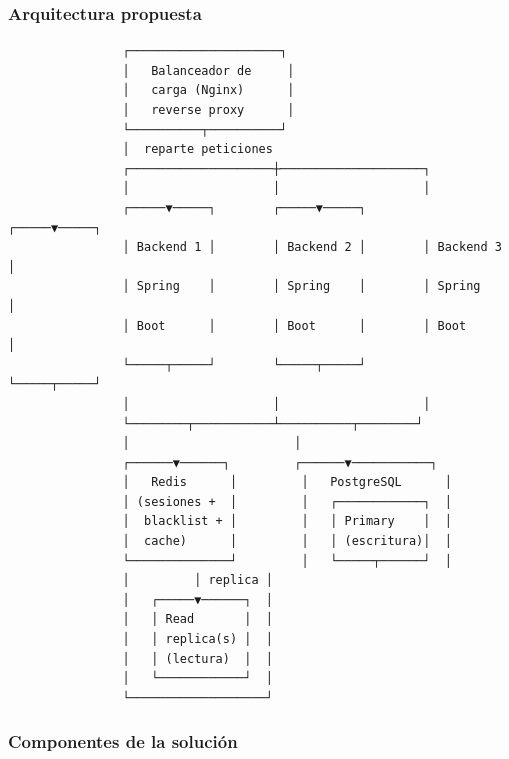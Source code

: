 \documentclass[12pt]{article}
\begin{document}
	\subsubsection*{Arquitectura propuesta}
	
	\begin{mdframed}[linecolor=gray!40, backgroundcolor=gray!5, linewidth=1pt]
		\begin{ttfamily}\footnotesize
			\begin{verbatim}
				┌─────────────────────┐
				│   Balanceador de     │
				│   carga (Nginx)      │
				│   reverse proxy      │
				└──────────┬──────────┘
				│  reparte peticiones
				┌────────────────────┼────────────────────┐
				│                    │                    │
				┌─────▼─────┐        ┌─────▼─────┐        ┌─────▼─────┐
				│ Backend 1 │        │ Backend 2 │        │ Backend 3 │
				│ Spring    │        │ Spring    │        │ Spring    │
				│ Boot      │        │ Boot      │        │ Boot      │
				└─────┬─────┘        └─────┬─────┘        └─────┬─────┘
				│                    │                    │
				└────────┬───────────┴──────────┬────────┘
				│                       │
				┌──────▼──────┐         ┌──────▼───────────┐
				│   Redis      │         │   PostgreSQL      │
				│ (sesiones +  │         │   ┌────────────┐  │
				│  blacklist + │         │   │ Primary    │  │
				│  cache)      │         │   │ (escritura)│  │
				└──────────────┘         │   └─────┬──────┘  │
				│         │ replica │
				│   ┌─────▼──────┐  │
				│   │ Read       │  │
				│   │ replica(s) │  │
				│   │ (lectura)  │  │
				│   └────────────┘  │
				└───────────────────┘
			\end{verbatim}
		\end{ttfamily}
	\end{mdframed}
	
	\subsubsection*{Componentes de la solución}
	
\end{document}
